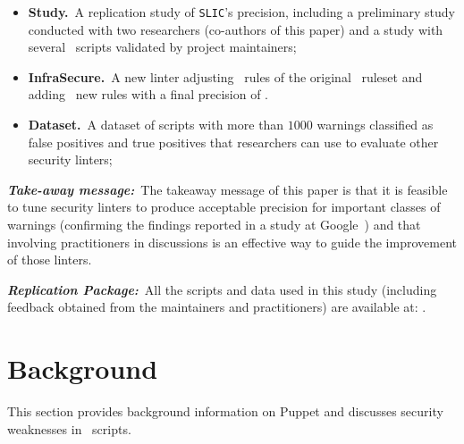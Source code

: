 \begin{itemize}[topsep=.2ex,itemsep=.2ex,leftmargin=0.8em]
    \item[\Contrib{}]\textbf{Study.}~A replication study of \texttt{SLIC}'s precision,
    including a preliminary study conducted with two researchers (co-authors of this paper)
    and a study with several \github\ scripts validated by project maintainers;
    \item[\Contrib{}]\textbf{InfraSecure.}~A new linter
    adjusting \noRulesSlic\ rules of the original
    \slic\ ruleset and adding \newRules\ new rules with a final precision of \finalPrecision.
    \item[\Contrib{}]\textbf{Dataset.}~A dataset of \iac{} scripts with more than $1000$ warnings
    classified as false positives and true positives that researchers can use to evaluate
    other security linters;
\end{itemize}

\noindent\textbf{\textit{Take-away message:}}~The takeaway message of
this paper is that it is feasible to tune security linters to produce
acceptable precision for important classes of warnings (confirming the
findings reported in a study at Google~\cite{46576}) and
that involving practitioners in discussions is an effective way to
guide the improvement of those linters.

\noindent\textbf{\textit{Replication Package:}}~All the scripts and data
    used in this study (including feedback obtained from the maintainers and practitioners)
    are available at: \repPackage{}.

\section{Background}\label{sec:background}

This section provides background information on Puppet and
discusses security weaknesses in \iac\ scripts.

